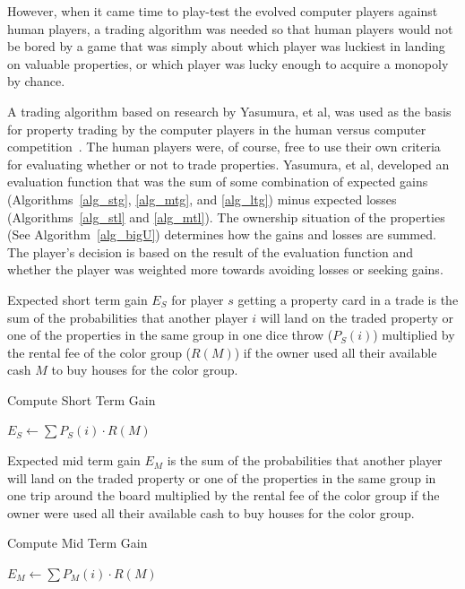 However, when it came time to play-test the evolved computer players against
human players, a trading algorithm was needed so that human players would not be
bored by a game that was simply about which player was luckiest in landing on
valuable properties, or which player was lucky enough to acquire a monopoly by
chance.

A trading algorithm based on research by Yasumura, et al, was used as the basis
for property trading by the computer players in the human versus computer
competition~\cite{Yasumura2001Negotiate}. The human players were, of course,
free to use their own criteria for evaluating whether or not to trade
properties. Yasumura, et al, developed an evaluation function that was the sum
of some combination of expected gains (Algorithms~\ref{alg_stg}, \ref{alg_mtg},
and \ref{alg_ltg}) minus expected losses (Algorithms~\ref{alg_stl} and
\ref{alg_mtl}). The ownership situation of the properties (See
Algorithm~\ref{alg_bigU}) determines how the gains and losses are summed. The
player's decision is based on the result of the evaluation function and whether
the player was weighted more towards avoiding losses or seeking gains.

Expected short term gain \(E_S\) for player \(s\) getting a property card in a
trade is the sum of the probabilities that another player \(i\) will land on the
traded property or one of the properties in the same group in one dice throw
(\(P_S(i)\)) multiplied by the rental fee of the color group (\(R(M)\)) if the
owner used all their available cash \(M\) to buy houses for the color group.
\begin{algorithm} 
\caption{Compute Short Term Gain}
\label{alg_stg}
\begin{algorithmic}
   \STATE $E_S \gets \sum P_S(i) \cdot R(M)$ 
\end{algorithmic}
\end{algorithm}

Expected mid term gain \(E_M\) is the sum of the probabilities that another
player will land on the traded property or one of the properties in the same group in
one trip around the board multiplied by the rental fee of the color group if the
owner were used all their available cash to buy houses for the color group.
\begin{algorithm} 
\caption{Compute Mid Term Gain}
\label{alg_mtg}
\begin{algorithmic}
   \STATE $E_M \gets \sum P_M(i) \cdot R(M)$ 
\end{algorithmic}
\end{algorithm}

